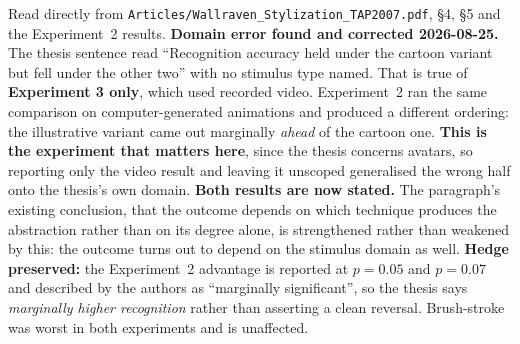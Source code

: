 \documentclass[11pt, a4paper]{article}
\begin{document}
\begin{Form}
  {Read directly from \texttt{\footnotesize Articles/Wallraven\_Stylization\_TAP2007.pdf}, \S4, \S5 and the Experiment~2 results. \textbf{Domain error found and corrected 2026-08-25.} The thesis sentence read ``Recognition accuracy held under the cartoon variant but fell under the other two'' with no stimulus type named. That is true of \textbf{Experiment 3 only}, which used recorded video. Experiment~2 ran the same comparison on computer-generated animations and produced a different ordering: the illustrative variant came out marginally \emph{ahead} of the cartoon one. \textbf{This is the experiment that matters here}, since the thesis concerns avatars, so reporting only the video result and leaving it unscoped generalised the wrong half onto the thesis's own domain. \textbf{Both results are now stated.} The paragraph's existing conclusion, that the outcome depends on which technique produces the abstraction rather than on its degree alone, is strengthened rather than weakened by this: the outcome turns out to depend on the stimulus domain as well. \textbf{Hedge preserved:} the Experiment~2 advantage is reported at $p = 0.05$ and $p = 0.07$ and described by the authors as ``marginally significant'', so the thesis says \emph{marginally higher recognition} rather than asserting a clean reversal. Brush-stroke was worst in both experiments and is unaffected.}


\end{Form}
\end{document}
